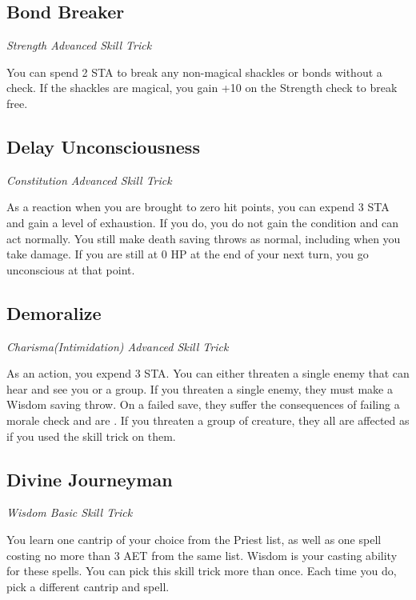 \subsection{Bond Breaker}

\textit{Strength Advanced Skill Trick}

You can spend 2 STA to break any non-magical shackles or bonds without a check. If the shackles are magical, you gain +10 on the Strength check to break free.

\subsection{Delay Unconsciousness}

\textit{Constitution Advanced Skill Trick}

As a reaction when you are brought to zero hit points, you can expend 3 STA and gain a level of exhaustion. If you do, you do not gain the  condition and can act normally. You still make death saving throws as normal, including when you take damage. If you are still at 0 HP at the end of your next turn, you go unconscious at that point.

\subsection{Demoralize}\label{st:demoralize}

\textit{Charisma(Intimidation) Advanced Skill Trick}

As an action, you expend 3 STA. You can either threaten a single enemy that can hear and see you or a group. If you threaten a single enemy, they must make a Wisdom saving throw. On a failed save, they suffer the consequences of failing a morale check and are . If you threaten a group of creature, they all are affected as if you used the  skill trick on them.

\subsection{Divine Journeyman}

\textit{Wisdom Basic Skill Trick}

You learn one cantrip of your choice from the Priest list, as well as one spell costing no more than 3 AET from the same list. Wisdom is your casting ability for these spells. You can pick this skill trick more than once. Each time you do, pick a different cantrip and spell.

